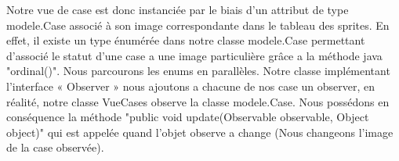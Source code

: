 \documentclass[a4paper,12pt]{article} %
\begin{document}
Notre vue de case est donc instanciée par le biais d’un attribut de type modele.Case associé à son image correspondante dans le tableau des sprites. En effet, il existe un type énumérée dans notre classe modele.Case permettant d’associé le statut d’une case a une image particulière grâce a la méthode java "ordinal()". Nous parcourons les enums en parallèles.
\newline\newline
Notre classe implémentant l’interface « Observer » nous ajoutons a chacune de nos case un observer, en réalité, notre classe VueCases observe la classe modele.Case.
\newline\newline
Nous possédons en conséquence la méthode "public void update(Observable observable, Object object)" qui est appelée quand l'objet observe a change (Nous changeons l’image de la case observée).
\newpage
\end{document}
